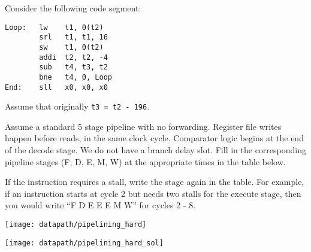 \begin{blocksection}
Consider the following code segment:
\begin{verbatim}
Loop:	lw    t1, 0(t2)
		srl   t1, t1, 16
		sw    t1, 0(t2)
		addi  t2, t2, -4
		sub	  t4, t3, t2
		bne   t4, 0, Loop
End: 	sll   x0, x0, x0
\end{verbatim}
Assume that originally \texttt{t3 = t2 - 196}.

\question Assume a standard 5 stage pipeline with no forwarding. Register file writes happen before reads, in the same clock cycle. Comparator logic begins at the end of the decode stage. We do not have a branch delay slot. Fill in the corresponding pipeline stages (F, D, E, M, W) at the appropriate times in the table below. 

If the instruction requires a stall, write the stage again in the table. For example, if an instruction starts at cycle 2 but needs two stalls for the execute stage, then you would write “F D E E E M W” for cycles 2 - 8. 

\texttt{[image: datapath/pipelining\_hard]}

\begin{solution}
\texttt{[image: datapath/pipelining\_hard\_sol]}
\end{solution}

\end{blocksection}